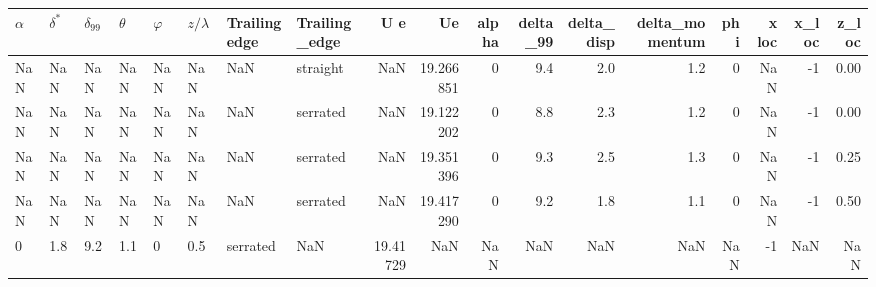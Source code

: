 \begin{tabular}{llllllllrrrrrrrrrr}
\toprule
$\alpha$ & $\delta^*$ & $\delta_{99}$ & $\theta$ & $\varphi$ & $z/\lambda$ & Trailing edge & Trailing_edge &       U e &         Ue &  alpha &  delta_99 &  delta_disp &  delta_momentum &  phi &  x loc &  x_loc &  z_loc \\
\midrule
     NaN &        NaN &           NaN &      NaN &       NaN &         NaN &           NaN &      straight &       NaN &  19.266851 &      0 &       9.4 &         2.0 &             1.2 &    0 &    NaN &     -1 &   0.00 \\
     NaN &        NaN &           NaN &      NaN &       NaN &         NaN &           NaN &      serrated &       NaN &  19.122202 &      0 &       8.8 &         2.3 &             1.2 &    0 &    NaN &     -1 &   0.00 \\
     NaN &        NaN &           NaN &      NaN &       NaN &         NaN &           NaN &      serrated &       NaN &  19.351396 &      0 &       9.3 &         2.5 &             1.3 &    0 &    NaN &     -1 &   0.25 \\
     NaN &        NaN &           NaN &      NaN &       NaN &         NaN &           NaN &      serrated &       NaN &  19.417290 &      0 &       9.2 &         1.8 &             1.1 &    0 &    NaN &     -1 &   0.50 \\
       0 &        1.8 &           9.2 &      1.1 &         0 &         0.5 &      serrated &           NaN &  19.41729 &        NaN &    NaN &       NaN &         NaN &             NaN &  NaN &     -1 &    NaN &    NaN \\
\bottomrule
\end{tabular}
